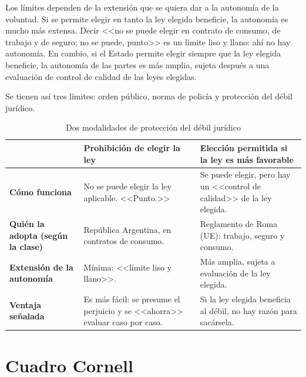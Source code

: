 \documentclass[12pt,oneside]{book}
\begin{document}
Los l\'imites dependen de la extensi\'on que se quiera dar a la autonom\'ia de la voluntad. Si se permite elegir en tanto la ley elegida beneficie, la autonom\'ia es mucho m\'as extensa. Decir <<no se puede elegir en contrato de consumo, de trabajo y de seguro; no se puede, punto>> es un l\'imite liso y llano: ah\'i no hay autonom\'ia. En cambio, si el Estado permite elegir siempre que la ley elegida beneficie, la autonom\'ia de las partes es m\'as amplia, sujeta despu\'es a una evaluaci\'on de control de calidad de las leyes elegidas.

Se tienen as\'i tres l\'imites: orden p\'ublico, norma de polic\'ia y protecci\'on del d\'ebil jur\'idico.

\begin{table}[H]
\centering
\caption{Dos modalidades de protecci\'on del d\'ebil jur\'idico}
\small
\begin{tabularx}{\textwidth}{
    >{\raggedright\arraybackslash}p{}
    >{\raggedright\arraybackslash}X
    >{\raggedright\arraybackslash}X
}
\toprule
 & \textbf{Prohibici\'on de elegir la ley} & \textbf{Elecci\'on permitida si la ley es m\'as favorable} \\
\midrule
\textbf{C\'omo funciona} & No se puede elegir la ley aplicable. <<Punto.>> & Se puede elegir, pero hay un <<control de calidad>> de la ley elegida. \\
\addlinespace
\textbf{Qui\'en la adopta (seg\'un la clase)} & Rep\'ublica Argentina, en contratos de consumo. & Reglamento de Roma (UE): trabajo, seguro y consumo. \\
\addlinespace
\textbf{Extensi\'on de la autonom\'ia} & M\'inima: <<l\'imite liso y llano>>. & M\'as amplia, sujeta a evaluaci\'on de la ley elegida. \\
\addlinespace
\textbf{Ventaja se\~nalada} & Es m\'as f\'acil: se presume el perjuicio y se <<ahorra>> evaluar caso por caso. & Si la ley elegida beneficia al d\'ebil, no hay raz\'on para sac\'arsela. \\
\bottomrule
\end{tabularx}
\end{table}

\section{Cuadro Cornell}
\end{document}
